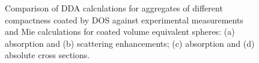 \begin{figure}[htp]
{}
    \caption{Comparison of DDA calculations for aggregates of different compactness coated by DOS against experimental measurements and Mie calculations for coated volume equivalent spheres: (a) absorption and (b) scattering enhancements; (c) absorption and (d) absolute cross sections.}
    \label{fig:dda}
\end{figure}



